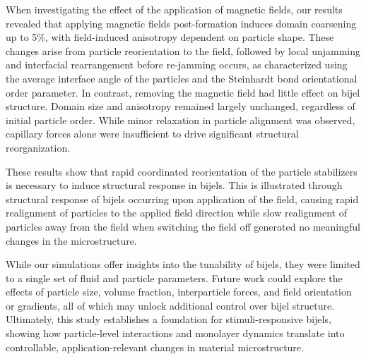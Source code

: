 When investigating the effect of the application of magnetic fields, our results revealed that applying magnetic fields post-formation induces domain coarsening up to 5\%, with 
field-induced anisotropy dependent on particle shape. These changes arise from particle reorientation to the field, followed by 
local unjamming and interfacial rearrangement before re-jamming occurs, as characterized using the average interface angle of the particles and the 
Steinhardt bond orientational order parameter. In contrast, removing the magnetic field had little effect 
on bijel structure. Domain size and anisotropy remained largely unchanged, regardless of initial particle order. While minor relaxation in particle alignment was observed, 
capillary forces alone were insufficient to drive significant structural reorganization.

These results show that rapid coordinated reorientation of the particle stabilizers is necessary to induce structural response in bijels. This is illustrated through structural response
of bijels occurring upon application of the field, causing rapid realignment of particles to the applied field direction while slow realignment of particles away from
the field when switching the field off generated no meaningful changes in the microstructure.

While our simulations offer insights into the tunability of bijels, they were limited to a single set of fluid and particle parameters. Future work could explore the 
effects of particle size, volume fraction, interparticle forces, and field orientation or gradients, all of which may unlock additional control over bijel structure.
Ultimately, this study establishes a foundation for stimuli-responsive bijels, showing how particle-level interactions and monolayer dynamics translate into controllable, 
application-relevant changes in material microstructure.